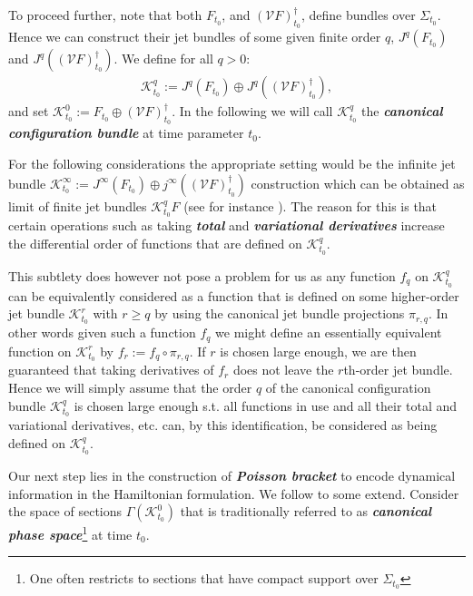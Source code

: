 To proceed further, note that both $F_{t_0}$, and $(\mathcal{V}F)_{t_0}^{\dagger}$, define bundles over $\Sigma_{t_0}$. Hence we can construct their jet bundles of some given finite order $q$, $J^q(F_{t_0})$ and $J^q((\mathcal{V}F)_{t_0}^{\dagger})$. 
We define for all $q>0$:
\begin{align} 
\mathcal{K}^q_{t_0} := J^q(F_{t_0})\oplus J^q((\mathcal{V}F)_{t_0}^{\dagger}),
\end{align}
and set $\mathcal{K}^0_{t_0} := F_{t_0}\oplus (\mathcal{V}F)_{t_0}^{\dagger}$.
In the following we will call $\mathcal{K}^q_{t_0}$ the \textit{\textbf{canonical configuration bundle}} at time parameter $t_0$. 

\begin{remark}
For the following considerations the appropriate setting would be the infinite jet bundle $\mathcal{K}^{\infty}_{t_0} := J^{\infty}(F_{t_0})\oplus j^{\infty}((\mathcal{V}F)_{t_0}^{\dagger})$ construction which can be obtained as limit of finite jet bundles $\mathcal{K}^q_{t_0}F$ (see for instance \cite{saunders_1989}). The reason for this is that certain operations such as taking \textit{\textbf{total}} and \textit{\textbf{variational derivatives}} increase the differential order of functions that are defined on $\mathcal{K}^{q}_{t_0}$.

This subtlety does however not pose a problem for us as any function $f_q$ on $\mathcal{K}^q_{t_0}$ can be equivalently considered as a function that is defined on some higher-order jet bundle $\mathcal{K}^r_{t_0}$ with $r\geq q$ by using the canonical jet bundle projections $\pi_{r,q}$. In other words given such a function $f_q$ we might define an essentially equivalent function on $\mathcal{K}^r_{t_0}$ by $f_r:=f_q \circ \pi_{r,q}$. If $r$ is chosen large enough, we are then guaranteed that taking derivatives of $f_r$ does not leave the $r$th-order jet bundle. Hence we will simply assume that the order $q$ of the canonical configuration bundle $\mathcal{K}^q_{t_0}$ is chosen large enough s.t. all functions in use and all their total and variational derivatives, etc. can, by this identification, be considered as being defined on $\mathcal{K}^q_{t_0}$. 
\end{remark}

Our next step lies in the construction of \textit{\textbf{Poisson bracket}} to encode dynamical information in the Hamiltonian formulation. 
We follow \cite{1997hep.th....9164B} to some extend. Consider the space of sections  $\Gamma(\mathcal{K}^0_{t_0})$ that is traditionally referred to as \textit{\textbf{canonical phase space}}\footnote{One often restricts to sections that have compact support over $\Sigma_{t_0}$} at time $t_0$. 

